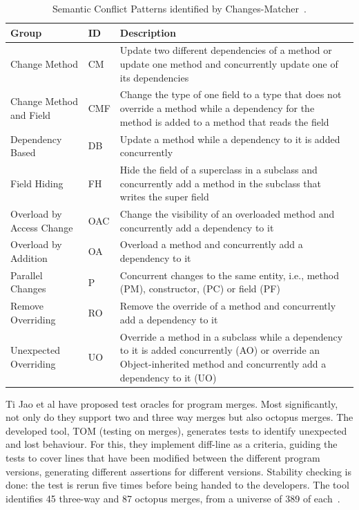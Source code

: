 \begin{table}[!h]
\setlength\extrarowheight{2pt}
\begin{tabularx}{\textwidth}{|l|l|X|}
 \hline
 Group & ID & Description \\ [0.5ex] 
 \hline\hline
 Change Method  & CM & Update two different dependencies of a method or update one method and concurrently update one of its
dependencies \\ 
 \hline
 Change Method
and Field & CMF & Change the type of one field to a type that does not
override a method while a dependency for the method
is added to a method that reads the field
 \\
 \hline
 Dependency
Based & DB & Update a method while a dependency to it is added
concurrently \\
 \hline
 Field Hiding & FH & Hide the field of a superclass in a subclass and concurrently add a method in the subclass that writes the
super field
 \\
 \hline
 Overload by Access Change & OAC & Change the visibility of an overloaded method and
concurrently add a dependency to it \\ 
 \hline
 Overload by Addition & OA & Overload a method and concurrently add a dependency to it \\  
 \hline
 Parallel Changes & P & Concurrent changes to the same entity, i.e., method
(PM), constructor, (PC) or field (PF) \\ 
 \hline
 Remove Overriding & RO & Remove the override of a method and concurrently
add a dependency to it \\  
  \hline
 Unexpected Overriding & UO & Override a method in a subclass while a dependency to it is added concurrently (AO) or override an
Object-inherited method and concurrently add a dependency to it (UO) \\ [1ex] 
 \hline
\end{tabularx}
\caption{\label{table:pattern-table}Semantic Conflict Patterns identified by Changes-Matcher~\cite{kn:nuno}.}
\end{table}


Ti Jao et al have proposed test oracles for program merges. Most significantly, not only do they support two and three way merges but also octopus merges. The developed tool, TOM (testing on merges), generates tests to identify unexpected and lost behaviour. For this, they implement diff-line as a criteria, guiding the tests to cover lines that have been modified between the different program versions, generating different assertions for different versions. Stability checking is done: the test is rerun five times before being handed to the developers. The tool identifies 45 three-way and 87 octopus merges, from a universe of 389 of each~\cite{kn:ji2022}.

